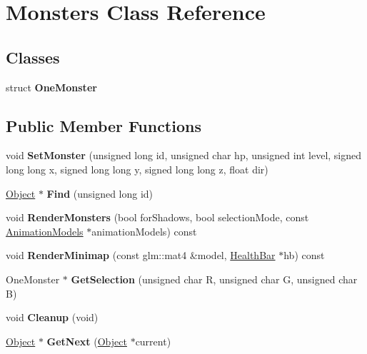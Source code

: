 \hypertarget{classMonsters}{\section{\-Monsters \-Class \-Reference}
\label{classMonsters}
}
\subsection*{\-Classes}
\begin{DoxyCompactItemize}
\item 
struct {\bfseries \-One\-Monster}
\end{DoxyCompactItemize}
\subsection*{\-Public \-Member \-Functions}
\begin{DoxyCompactItemize}
\item 
\hypertarget{classMonsters_a8d35357d16ed1b11b07a3bbee512c6c1}{void {\bfseries \-Set\-Monster} (unsigned long id, unsigned char hp, unsigned int level, signed long long x, signed long long y, signed long long z, float dir)}\label{classMonsters_a8d35357d16ed1b11b07a3bbee512c6c1}

\item 
\hypertarget{classMonsters_a1c2660b1274f680400741130571dea70}{\hyperlink{classObject}{\-Object} $\ast$ {\bfseries \-Find} (unsigned long id)}\label{classMonsters_a1c2660b1274f680400741130571dea70}

\item 
\hypertarget{classMonsters_ab7fc77e933f6c7984cb3449b080495fd}{void {\bfseries \-Render\-Monsters} (bool for\-Shadows, bool selection\-Mode, const \hyperlink{classAnimationModels}{\-Animation\-Models} $\ast$animation\-Models) const }\label{classMonsters_ab7fc77e933f6c7984cb3449b080495fd}

\item 
\hypertarget{classMonsters_a5ebd927b5c5d174833768772d39d31f2}{void {\bfseries \-Render\-Minimap} (const glm\-::mat4 \&model, \hyperlink{classHealthBar}{\-Health\-Bar} $\ast$hb) const }\label{classMonsters_a5ebd927b5c5d174833768772d39d31f2}

\item 
\hypertarget{classMonsters_a669fad1d98edf18ab53219d5476da82f}{\-One\-Monster $\ast$ {\bfseries \-Get\-Selection} (unsigned char \-R, unsigned char \-G, unsigned char \-B)}\label{classMonsters_a669fad1d98edf18ab53219d5476da82f}

\item 
\hypertarget{classMonsters_a4fcb289716127854078ba69a89079cb0}{void {\bfseries \-Cleanup} (void)}\label{classMonsters_a4fcb289716127854078ba69a89079cb0}

\item 
\hypertarget{classMonsters_acf3a50904f2bb6f36caa9499f4d88eef}{\hyperlink{classObject}{\-Object} $\ast$ {\bfseries \-Get\-Next} (\hyperlink{classObject}{\-Object} $\ast$current)}\label{classMonsters_acf3a50904f2bb6f36caa9499f4d88eef}

\end{DoxyCompactItemize}
